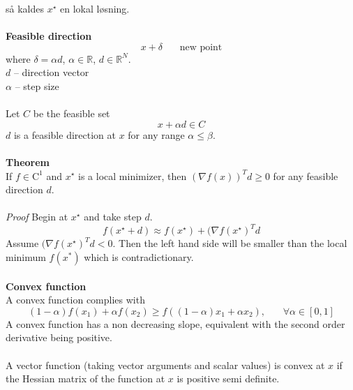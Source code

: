 \documentclass[12pt,a4paper]{report}
\begin{document}
så kaldes $x^{\star}$ en lokal løsning.\\\\
\textbf{Feasible direction}\\
\begin{equation}
x+\delta\phantom{mm}\text{new point}
\end{equation}
where $\delta=\alpha d$, $\alpha\in\mathbb{R}$, $d\in\mathbb{R}^N$.\\
$d$ -- direction vector\\
$\alpha$ -- step size\\\\
Let $C$ be the feasible set
\begin{equation}
x+\alpha d\in C
\end{equation}
$d$ is a feasible direction at $x$ for any range $\alpha\leq\beta$.\\\\
\textbf{Theorem}\\
If $f\in\mathrm{C}^1$ and $x^{\star}$ is a local minimizer, then $(\nabla f(x))^Td\geq 0$ for any feasible direction $d$.\\\\
\textit{Proof}
Begin at $x^{\star}$ and take step $d$.
\begin{equation}
f(x^{\star}+d)\approx f(x^{\star})+(\nabla f(x^{\star})^Td
\end{equation}
Assume $(\nabla f(x^{\star})^Td<0$. Then the left hand side will be smaller than the local minimum $f(x^*)$ which is contradictionary.\\\\
\textbf{Convex function}\\
A convex function complies with
\begin{equation}
(1-\alpha)f(x_1)+\alpha f(x_2)\geq f((1-\alpha)x_1+\alpha x_2),\phantom{mm}\forall\alpha\in[0,1]
\end{equation}
A convex function has a non decreasing slope, equivalent with the second order derivative being positive.\\\\
A vector function (taking vector arguments and scalar values) is convex at $x$ if the Hessian matrix of the function at $x$ is positive semi definite.
\end{document}
